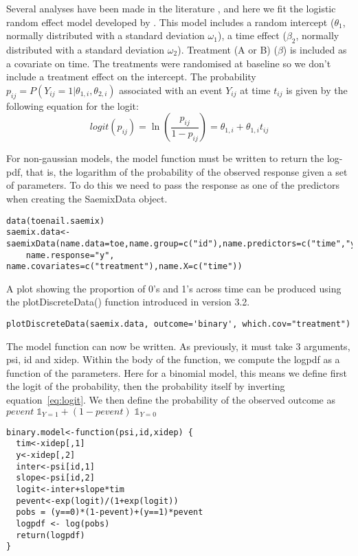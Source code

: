 Several analyses have been made in the literature \cite{lesaffre2001effect,lin2011goodness}, and here we fit the logistic random effect model developed by \cite{hedeker1994random}. This model includes a random intercept ($\theta_1$, normally distributed with a standard deviation $\omega_1$),  a time effect ($\beta_2$, normally distributed with a standard deviation $\omega_2$). Treatment (A or B) ($\beta$) is included as a covariate on time. The treatments were randomised at baseline so we don't include a treatment effect on the intercept. The probability $p_{ij}=P(Y_{ij}=1 | \theta_{1,i}, \theta_{2,i})$ associated with an event $Y_{ij}$ at time $t_{ij}$ is given by the following equation for the logit:
\begin{equation}
logit(p_{ij}) = \ln \left( \frac{p_{ij}}{1-p_{ij}} \right) = \theta_{1,i} + \theta_{1,i} t_{ij} \label{eq:logit}
\end{equation}

For non-gaussian models, the model function must be written to return the log-pdf, that is, the logarithm of the probability of the observed response given a set of parameters. To do this we need to pass the response as one of the predictors when creating the {\sf SaemixData} object.
\begin{verbatim}
data(toenail.saemix)
saemix.data<-saemixData(name.data=toe,name.group=c("id"),name.predictors=c("time","y"), 
    name.response="y", name.covariates=c("treatment"),name.X=c("time"))
\end{verbatim}

A plot showing the proportion of 0's and 1's across time can be produced using the {\sf plotDiscreteData()} function introduced in version 3.2.
\begin{verbatim}
plotDiscreteData(saemix.data, outcome='binary', which.cov="treatment")
\end{verbatim}

The model function can now be written. As previously, it must take 3 arguments, {\sf psi}, {\sf id} and {\sf xidep}. Within the body of the function, we compute the logpdf as a function of the parameters. Here for a binomial model, this means we define first the logit of the probability, then the probability itself by inverting equation~\ref{eq:logit}. We then define the probability of the observed outcome as $pevent \; \mathbb{1}_{Y=1} + (1-pevent) \; \mathbb{1}_{Y=0}$
\begin{verbatim}
binary.model<-function(psi,id,xidep) {
  tim<-xidep[,1]
  y<-xidep[,2]
  inter<-psi[id,1]
  slope<-psi[id,2]
  logit<-inter+slope*tim
  pevent<-exp(logit)/(1+exp(logit))
  pobs = (y==0)*(1-pevent)+(y==1)*pevent
  logpdf <- log(pobs)
  return(logpdf)
}
\end{verbatim}

